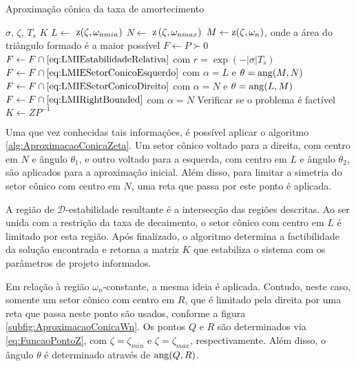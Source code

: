 \begin{algorithm}[ht!]
  \caption{Aproximação cônica da taxa de amortecimento}\label{alg:AproximacaoConicaZeta}
  \begin{algorithmic}[1]
    \Require $\sigma$, $\zeta$, $T_s$
    \Ensure $K$
    \State $L \gets $ $\operatorname{\mathrm{z}}(\zeta,\omega_{nmin})$
    \State $N \gets $ $\operatorname{\mathrm{z}}\left(\zeta,\omega_{nmax}\right)$
    \State $M \gets \operatorname{\mathrm{z}}(\zeta,\omega_n)$, onde a área do triângulo formado é a maior possível
    \State $F \gets P \succ 0$
    \State $F \gets F \cap \eqref{eq:LMIEstabilidadeRelativa}$ com $r = \exp{\left(-|\sigma|T_s\right)}$ 
    \State $F \gets F \cap \eqref{eq:LMIESetorConicoEsquerdo}$ com $\alpha = L$ e $\theta = \operatorname{ang}(M,N)$ 
    \State $F \gets F \cap \eqref{eq:LMIESetorConicoDireito}$ com $\alpha = N$ e $\theta = \operatorname{ang}(L,M)$ 
    \State $F \gets F \cap \eqref{eq:LMIRightBounded}$ com $\alpha = N$  
    \State Verificar se o problema é factível
    \State $K \gets ZP^{-1}$
  \end{algorithmic}
\end{algorithm}

Uma que vez conhecidas tais informações, é possível aplicar o algoritmo \ref{alg:AproximacaoConicaZeta}. Um setor cônico voltado para a direita, com centro em $N$ e ângulo $\theta_1$, e outro voltado para a esquerda, com centro em $L$ e ângulo $\theta_2$, são aplicados para a aproximação inicial. Além disso, para limitar a simetria do setor cônico com centro em $N$, uma reta que passa por este ponto é aplicada.

A região de $\mathscr{D}$-estabilidade resultante é a intersecção das regiões descritas. Ao ser unida com a restrição da taxa de decaimento, o setor cônico com centro em $L$ é limitado por esta região. Após finalizado, o algoritmo determina a factibilidade da solução encontrada e retorna a matriz $K$ que estabiliza o sistema com os parâmetros de projeto informados.

Em relação à região $\omega_n$-constante, a mesma ideia é aplicada\cite{CHIQUETO2021}. Contudo, neste caso, somente um setor cônico com centro em $R$, que é limitado pela direita por uma reta que passa neste ponto são usados, conforme a figura \ref{subfig:AproximacaoConicaWn}. Os pontos $Q$ e $R$ são determinados via \eqref{eq:FuncaoPontoZ}, com $\zeta = \zeta_{min}$ e $\zeta = \zeta_{max}$, respectivamente. Além disso, o ângulo $\theta$ é determinado através de $\operatorname{ang}(Q,R)$.  

